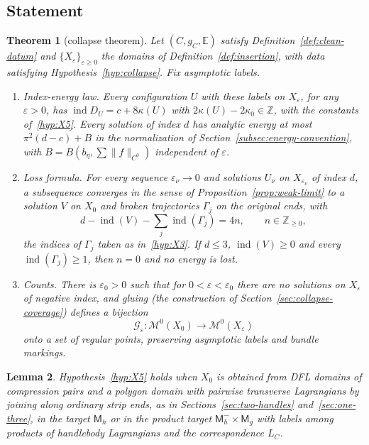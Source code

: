 \documentclass[11pt]{amsart}
\newtheorem{theorem}{Theorem}[section]
\newtheorem{lemma}[theorem]{Lemma}
\theoremstyle{definition}
\theoremstyle{remark}
\theoremstyle{plain}
\numberwithin{equation}{section}
\newcommand{\ZZ}{\mathbb{Z}}
\newcommand{\cG}{\mathcal{G}}
\newcommand{\cM}{\mathcal{M}}
\newcommand{\ind}{\operatorname{ind}}
\newcommand{\Msf}{\mathsf{M}}
\newcommand{\eps}{\varepsilon}
\begin{document}
\subsection{Statement}

\begin{theorem}[collapse theorem]\label{thm:collapse}
Let $(C,g_C,\mathbb E)$ satisfy Definition~\ref{def:clean-datum} and
$\{X_\eps\}_{\eps\ge0}$ the domains of Definition~\ref{def:insertion},
with data satisfying Hypothesis~\ref{hyp:collapse}. Fix asymptotic
labels.
\begin{enumerate}[label=(\roman*)]
\item \emph{Index-energy law.} Every configuration $U$ with
  these labels on $X_\eps$, for any $\eps>0$, has $\ind D_U=c+8\kappa(U)$
  with $2\kappa(U)-2\kappa_0\in\ZZ$, with the constants of~\ref{hyp:X5}.
  Every solution of index $d$ has analytic energy at most
  $\pi^2(d-c)+B$ in the normalization of
  Section~\ref{subsec:energy-convention}, with $B=B(b_\eta,\sum\|f\|_{C^0})$ independent of
  $\eps$.
\item \emph{Loss formula.} For every sequence $\eps_\nu\to0$ and
  solutions $U_\nu$ on $X_{\eps_\nu}$ of index $d$, a subsequence
  converges in the sense of Proposition~\ref{prop:weak-limit} to a solution
  $V$ on $X_0$ and broken trajectories $\Gamma_j$ on the original ends, with
  \[
  d-\ind(V)-\sum_j\ind(\Gamma_j)=4n,\qquad n\in\ZZ_{\ge0},
  \]
  the indices of $\Gamma_j$ taken as in~\ref{hyp:X3}. If $d\le3$,
  $\ind(V)\ge0$ and every $\ind(\Gamma_j)\ge1$, then $n=0$ and no energy is lost.
\item \emph{Counts.} There is $\eps_0>0$ such that for $0<\eps<\eps_0$
  there are no solutions on $X_\eps$ of negative index, and gluing (the
  construction of Section~\ref{sec:collapse-coverage}) defines a bijection
  \[
  \cG_\eps\colon\cM^0(X_0)\longrightarrow\cM^0(X_\eps)
  \]
  onto a set of regular points, preserving asymptotic labels and bundle
  markings.
\end{enumerate}
\end{theorem}

\begin{lemma}\label{lem:zero-scale-law}
Hypothesis~\ref{hyp:X5} holds when $X_0$ is obtained from DFL domains of
compression pairs and a polygon domain with pairwise transverse
Lagrangians by joining along ordinary strip ends, as in
Sections~\ref{sec:two-handles} and~\ref{sec:one-three}, in the target $\Msf_h$
or in the product target $\Msf_h^-\times\Msf_g$ with labels among products of
handlebody Lagrangians and the correspondence $L_C$.
\end{lemma}
\end{document}
